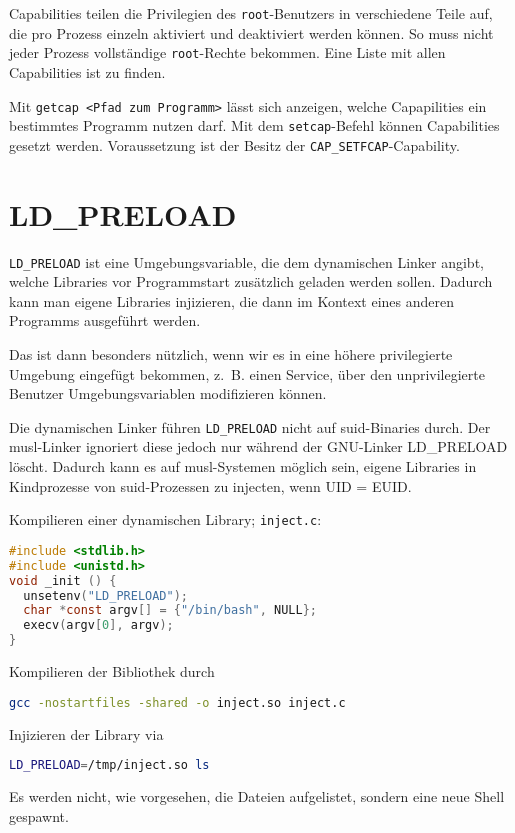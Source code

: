 \documentclass[
    parskip=half,
    landscape
]{scrartcl}
\let\originalhref\href
\renewcommand\href[2]{\originalhref{#1}{\color{blue}{#2}}}%
\begin{document}
\begin{multicols}{3}
Capabilities teilen die Privilegien des \texttt{root}-Benutzers in verschiedene Teile auf, 
die pro Prozess einzeln aktiviert und deaktiviert werden können. 
So muss nicht jeder Prozess vollständige \texttt{root}-Rechte bekommen.
Eine Liste mit allen Capabilities ist
\href{https://man7.org/linux/man-pages/man7/capabilities.7.html}{im
Manual} zu finden.

Mit \texttt{getcap <Pfad zum Programm>} lässt
sich anzeigen, welche Capapilities ein bestimmtes Programm nutzen darf.
Mit dem \texttt{setcap}-Befehl können Capabilities gesetzt werden.
Voraussetzung ist der Besitz der \texttt{CAP\_SETFCAP}-Capability.

\section{LD\_PRELOAD}

\texttt{LD\_PRELOAD} ist eine Umgebungsvariable, die dem dynamischen
Linker angibt, welche Libraries vor Programmstart zusätzlich geladen
werden sollen. Dadurch kann man eigene Libraries injizieren, die dann
im Kontext eines anderen Programms ausgeführt werden.

Das ist dann besonders nützlich, wenn wir es in eine höhere
privilegierte Umgebung eingefügt bekommen, \hbox{z. B.} einen Service, über den unprivilegierte Benutzer Umgebungsvariablen modifizieren können.

Die dynamischen Linker führen \texttt{LD\_PRELOAD} nicht auf
suid-Binaries durch. Der musl-Linker ignoriert diese jedoch nur während
der GNU-Linker LD\_PRELOAD löscht. Dadurch kann es auf musl-Systemen
möglich sein, eigene Libraries in Kindprozesse von suid-Prozessen zu
injecten, wenn UID = EUID.

Kompilieren einer dynamischen Library; \texttt{inject.c}:
\begin{lstlisting}[language=C]
#include <stdlib.h>
#include <unistd.h>
void _init () {
  unsetenv("LD_PRELOAD");
  char *const argv[] = {"/bin/bash", NULL};
  execv(argv[0], argv);
}
\end{lstlisting}
Kompilieren der Bibliothek durch
\begin{lstlisting}[language=Bash]
  gcc -nostartfiles -shared -o inject.so inject.c
\end{lstlisting}
Injizieren der Library via
\begin{lstlisting}[language=Bash]
LD_PRELOAD=/tmp/inject.so ls
\end{lstlisting}
Es werden nicht, wie vorgesehen, die Dateien aufgelistet, sondern eine neue Shell gespawnt.


\end{multicols}
\end{document}
